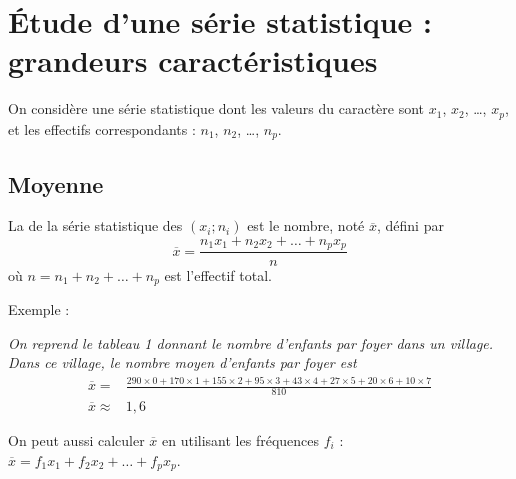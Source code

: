 \renewcommand{\exe}[1]{\par %
  \noindent%
  \fontfamily{cmss}\selectfont Exemple : \  \normalfont%
  \begin{minipage}[t]{0.85\linewidth}%
    \textit{#1}%
  \end{minipage} \par%
  \medskip
}

\section{Étude d'une série statistique : grandeurs caractéristiques}

On considère une série statistique dont les valeurs du caractère sont
$x_1$, $x_2$, {\ldots}, $x_p$, et les effectifs correspondants :
$n_1$, $n_2$, {\ldots}, $n_p$.



\subsection{Moyenne}

\begin{definition}
    La  de la série statistique des $(x_i;n_i)$ est le
  nombre, noté $\overline{x}$, défini par
  \[
  \overline{x} =
  \frac{n_1x_1+n_2x_2+{\ldots}+n_px_p}{n} 
  \]
  où $n = n_1+n_2+{\ldots}+n_p$ est l'effectif total.

    
\end{definition}

\bigskip


\exe{On reprend le tableau 1 donnant le nombre d'enfants par foyer
  dans un village. Dans ce village, le nombre moyen d'enfants par
  foyer est  
\begin{align*}
  \overline{x} = {} & 
  \frac{290\times0+170\times1+155\times2+95\times
    3+43\times 4+27\times 5+20\times 6+10\times 7}{810}
  \\[1ex]
  \overline{x} \approx {} & 1,6
\end{align*}
}
\medskip

\begin{remark}
On peut aussi calculer $\overline{x}$ en utilisant les fréquences
  $f_i$ : \\[1ex]
  $ \overline{x} = f_1 x_1 + f_2x_2+{\ldots}+f_px_p $. 

    
\end{remark}

\bigskip



